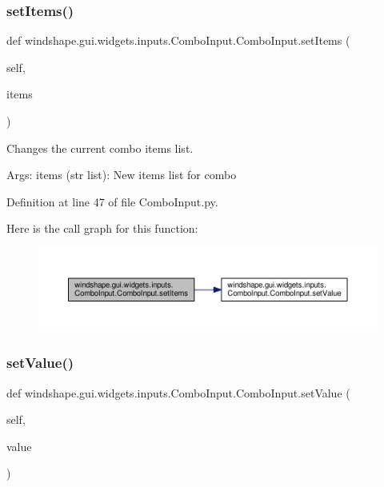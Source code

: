\subsubsection{\texorpdfstring{set\+Items()}{setItems()}}
{\footnotesize\ttfamily def windshape.\+gui.\+widgets.\+inputs.\+Combo\+Input.\+Combo\+Input.\+set\+Items (\begin{DoxyParamCaption}\item[{}]{self,  }\item[{}]{items }\end{DoxyParamCaption})}

\begin{DoxyVerb}Changes the current combo items list.

Args:
    items (str list): New items list for combo
\end{DoxyVerb}
 

Definition at line 47 of file Combo\+Input.\+py.

Here is the call graph for this function\+:\nopagebreak
\begin{figure}[H]
\begin{center}
\leavevmode
\includegraphics[width=350pt]{classwindshape_1_1gui_1_1widgets_1_1inputs_1_1_combo_input_1_1_combo_input_a6e4f777b5e442a666ca8d5c085bb8858_cgraph}
\end{center}
\end{figure}
\mbox{\label{classwindshape_1_1gui_1_1widgets_1_1inputs_1_1_combo_input_1_1_combo_input_a369ed62e24700499d10ffd993e9960b6}} 
\subsubsection{\texorpdfstring{set\+Value()}{setValue()}}
{\footnotesize\ttfamily def windshape.\+gui.\+widgets.\+inputs.\+Combo\+Input.\+Combo\+Input.\+set\+Value (\begin{DoxyParamCaption}\item[{}]{self,  }\item[{}]{value }\end{DoxyParamCaption})}

